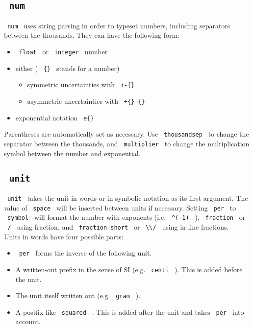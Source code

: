 \subsection{\texorpdfstring{\texttt{\ num\ }}{ num }}\label{num}

\texttt{\ num\ } uses string parsing in order to typeset numbers,
including separators between the thousands. They can have the following
form:

\begin{itemize}
\tightlist
\item
  \texttt{\ float\ } or \texttt{\ integer\ } number
\item
  either ( \texttt{\ \{\}\ } stands for a number)

  \begin{itemize}
  \tightlist
  \item
    symmetric uncertainties with \texttt{\ +-\{\}\ }
  \item
    asymmetric uncertainties with \texttt{\ +\{\}-\{\}\ }
  \end{itemize}
\item
  exponential notation \texttt{\ e\{\}\ }
\end{itemize}

Parentheses are automatically set as necessary. Use
\texttt{\ thousandsep\ } to change the separator between the thousands,
and \texttt{\ multiplier\ } to change the multiplication symbol between
the number and exponential.

\subsection{\texorpdfstring{\texttt{\ unit\ }}{ unit }}\label{unit}

\texttt{\ unit\ } takes the unit in words or in symbolic notation as its
first argument. The value of \texttt{\ space\ } will be inserted between
units if necessary. Setting \texttt{\ per\ } to \texttt{\ symbol\ } will
format the number with exponents (i.e. \texttt{\ \^{}(-1)\ } ),
\texttt{\ fraction\ } or \texttt{\ /\ } using fraction, and
\texttt{\ fraction-short\ } or
\texttt{\ \textbackslash{}\textbackslash{}/\ } using in-line
fractions.\\
Units in words have four possible parts:

\begin{itemize}
\tightlist
\item
  \texttt{\ per\ } forms the inverse of the following unit.
\item
  A written-out prefix in the sense of SI (e.g. \texttt{\ centi\ } ).
  This is added before the unit.
\item
  The unit itself written out (e.g. \texttt{\ gram\ } ).
\item
  A postfix like \texttt{\ squared\ } . This is added after the unit and
  takes \texttt{\ per\ } into account.
\end{itemize}

